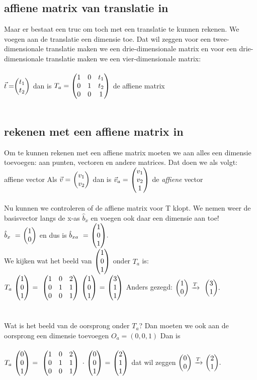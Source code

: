 \subsection{affiene  matrix van translatie in \RT}
Maar er bestaat een truc om  toch met een translatie te kunnen rekenen. We voegen aan de translatie een dimensie toe. Dat wil zeggen voor een twee-dimensionale translatie maken we een drie-dimensionale matrix en voor een drie-dimensionale translatie maken we een  vier-dimensionale matrix:\\ \\ 
 { $\vec{t} = \vectweesnel{t} $  \quad  dan is 
	$ T_a = \begin{pmatrix}  1 & 0 & t_1  \\  0 & 1 & t_2  \\ 0 & 0 & 1  \end{pmatrix} $ \quad de affiene matrix  } \\ \\
\subsection{rekenen met een affiene  matrix in \RT}
Om te kunnen rekenen met een affiene matrix moeten we aan alles een dimensie toevoegen: aan punten, vectoren en andere matrices. Dat doen we als volgt: 
\mydef
{affiene vector \RT}{Als  $\vec{v} = \ \vectweesnel{v} $ dan  is 
	$\vec{v}_a = \  \vecdrie{v_1}{v_2}{1}  $ \quad de \textit{affiene} vector } \\
 \\
Nu kunnen we  controleren of de affiene matrix voor\textit{ }T klopt. We nemen weer de basisvector langs de x-as $ \hat{b}_x $ en voegen ook daar een dimensie aan toe! \\
$ \hat{b}_x \ = \ \vectwee{1}{0} $ en dus is  
$ \hat{b}_{xa} \ = \  \vecdrie{1}{0}{1}. $ \\
We kijken wat het beeld van $ \vecdrie{1}{0}{1} $ onder \textit{$ T_a $} is: \\
$ T_a \ \vecdrie{1}{0}{1} \ 
= \ \matdrie{ 1 & 0 &  2 }{ 0 & 1 & 1 }{0 & 0 & 1 }  \ \vecdrie{1}{0}{1} \ 
=  \ \vecdrie{3}{1}{1} $  
\quad  Anders gezegd: \quad $ \vectwee{1}{0}  \  \xrightarrow{T}   \ \   \vectwee{ 3 } {1}. $\\ \\ \\
Wat is het beeld van de oorsprong onder \textit{$  T_a $}? Dan moeten we ook aan de oorsprong een dimensie toevoegen $ O_a = (0,0,1) $ Dan is \\ \\
$ T_a \ \vecdrie{0}{0}{1} \ 
= \ \matdrie{ 1 & 0 &  2 }{ 0 & 1 & 1 }{0 & 0 & 1 }  \ \cdot \ \vecdrie{0}{0}{1} \ 
=  \ \vecdrie{2}{1}{1} $ 
\quad dat wil zeggen \quad
$ \vectwee{0}{0}  \  \xrightarrow{T}   \   \vectwee{ 2 } {1}. $\\


